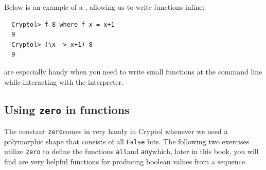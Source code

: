 
Below is an example of a \lamex, allowing us to write functions inline:
\begin{Verbatim}
  Cryptol> f 8 where f x = x+1
  9
  Cryptol> (\x -> x+1) 8
  9
\end{Verbatim}
\lamexs are especially handy when you need to write small functions at
the command line while interacting with the interpreter.



\subsection{Using {\tt zero} in functions}
\label{sec:using-tt-zero}

The constant {\tt zero}\indZero comes in very handy in Cryptol
whenever we need a polymorphic shape that consists of all {\tt False}
bits. The following two exercises utilize {\tt zero} to define the
functions {\tt all}\indAll and {\tt any}\indAny which, later in this
book, you will find are very helpful functions for producing boolean
values from a sequence.


